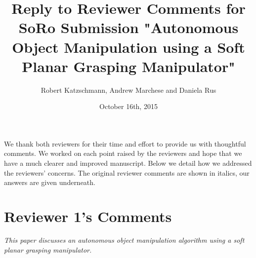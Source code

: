 \documentclass[letterpaper, 10 pt, twocolumn, conference]{article}
\begin{document}
\title{Reply to Reviewer Comments for SoRo Submission "Autonomous Object Manipulation using a Soft Planar Grasping Manipulator" }
\author{Robert Katzschmann, Andrew Marchese and Daniela Rus}
\date{October 16th, 2015}
\maketitle

We thank both reviewers for their time and effort to provide us with thoughtful comments. We worked on each point raised by the reviewers and hope that we have a much clearer and improved manuscript. Below we detail how we addressed the reviewers’ concerns. The original reviewer comments are shown in italics, our answers are given underneath. 


\section{Reviewer 1's Comments}

\textit{This paper discusses an autonomous object manipulation algorithm using a soft planar grasping manipulator.}
\end{document}
